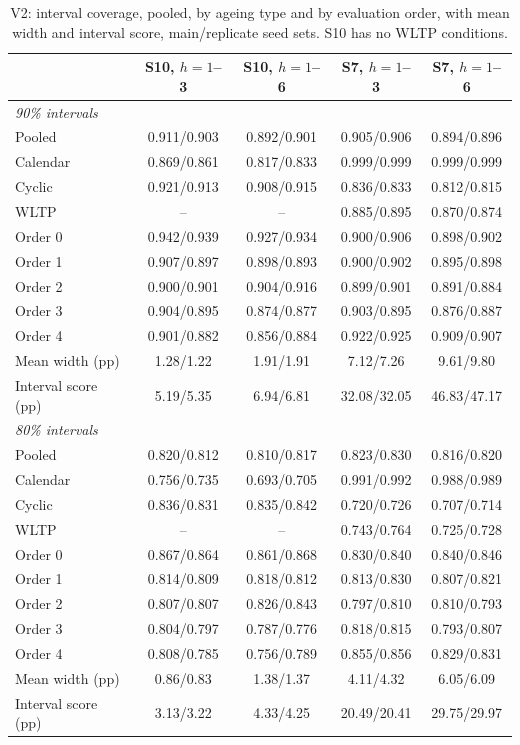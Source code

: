 \documentclass[conference]{IEEEtran}
\begin{document}
\begin{table}[!htb]
  \centering
  \caption{V2: interval coverage, pooled, by ageing type and by evaluation order, with mean width and interval score,
    main/replicate seed sets. S10 has no WLTP conditions.}
  \label{tab:d38_cov}
  \setlength{\tabcolsep}{2pt}
  \scriptsize
  \begin{tabular}{lcccc}
    \toprule
    & S10, $h{=}1$--3 & S10, $h{=}1$--6 & S7, $h{=}1$--3 & S7, $h{=}1$--6 \\
    \midrule
    \multicolumn{5}{l}{\emph{90\% intervals}} \\
    Pooled & 0.911/0.903 & 0.892/0.901 & 0.905/0.906 & 0.894/0.896 \\
    Calendar & 0.869/0.861 & 0.817/0.833 & 0.999/0.999 & 0.999/0.999 \\
    Cyclic & 0.921/0.913 & 0.908/0.915 & 0.836/0.833 & 0.812/0.815 \\
    WLTP & -- & -- & 0.885/0.895 & 0.870/0.874 \\
    Order 0 & 0.942/0.939 & 0.927/0.934 & 0.900/0.906 & 0.898/0.902 \\
    Order 1 & 0.907/0.897 & 0.898/0.893 & 0.900/0.902 & 0.895/0.898 \\
    Order 2 & 0.900/0.901 & 0.904/0.916 & 0.899/0.901 & 0.891/0.884 \\
    Order 3 & 0.904/0.895 & 0.874/0.877 & 0.903/0.895 & 0.876/0.887 \\
    Order 4 & 0.901/0.882 & 0.856/0.884 & 0.922/0.925 & 0.909/0.907 \\
    Mean width (pp) & 1.28/1.22 & 1.91/1.91 & 7.12/7.26 & 9.61/9.80 \\
    Interval score (pp) & 5.19/5.35 & 6.94/6.81 & 32.08/32.05 & 46.83/47.17 \\
    \multicolumn{5}{l}{\emph{80\% intervals}} \\
    Pooled & 0.820/0.812 & 0.810/0.817 & 0.823/0.830 & 0.816/0.820 \\
    Calendar & 0.756/0.735 & 0.693/0.705 & 0.991/0.992 & 0.988/0.989 \\
    Cyclic & 0.836/0.831 & 0.835/0.842 & 0.720/0.726 & 0.707/0.714 \\
    WLTP & -- & -- & 0.743/0.764 & 0.725/0.728 \\
    Order 0 & 0.867/0.864 & 0.861/0.868 & 0.830/0.840 & 0.840/0.846 \\
    Order 1 & 0.814/0.809 & 0.818/0.812 & 0.813/0.830 & 0.807/0.821 \\
    Order 2 & 0.807/0.807 & 0.826/0.843 & 0.797/0.810 & 0.810/0.793 \\
    Order 3 & 0.804/0.797 & 0.787/0.776 & 0.818/0.815 & 0.793/0.807 \\
    Order 4 & 0.808/0.785 & 0.756/0.789 & 0.855/0.856 & 0.829/0.831 \\
    Mean width (pp) & 0.86/0.83 & 1.38/1.37 & 4.11/4.32 & 6.05/6.09 \\
    Interval score (pp) & 3.13/3.22 & 4.33/4.25 & 20.49/20.41 & 29.75/29.97 \\
    \bottomrule
  \end{tabular}
\end{table}
\end{document}
